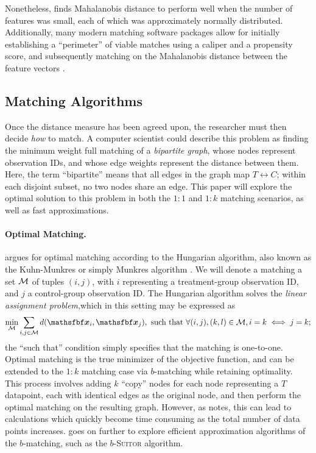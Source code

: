 \documentclass[11pt]{extarticle}
\begin{document}
Nonetheless, \textcite{leacy_joint_2014} finds Mahalanobis distance to perform well when the number of features was small, each of which was approximately normally distributed. Additionally, many modern matching software packages allow for initially establishing a ``perimeter'' of viable matches using a caliper and a propensity score, and subsequently matching on the Mahalanobis distance between the feature vectors \parencite{ho_matchit_2011}.


\subsection{Matching Algorithms}

Once the distance measure has been agreed upon, the researcher must then decide \emph{how} to match. A computer scientist could describe this problem as finding the minimum weight full matching of a \emph{bipartite graph}, whose nodes represent observation IDs, and whose edge weights represent the distance between them. Here, the term ``bipartite'' means that all edges in the graph map $T \leftrightarrow C$; within each disjoint subset, no two nodes share an edge. This paper will explore the optimal solution to this problem in both the $1:1$ and $1:k$ matching scenarios, as well as fast approximations.


\paragraph{Optimal Matching.} \textcite{rosenbaum_optimal_1989} argues for optimal matching according to the Hungarian algorithm, also known as the Kuhn-Munkres or simply Munkres algorithm \parencite{munkres_algorithms_1957}. We will denote a matching a set $\mathcal{M}$ of tuples $(i, j)$, with $i$ representing a treatment-group observation ID, and $j$ a control-group observation ID. The Hungarian algorithm solves the \emph{linear assignment problem},which in this setting may be expressed as
\begin{equation}
  \min_{\set{M}} \sum_{i, j \in \set{M}} d(\vec{x}_i, \vec{x}_j), \text{ such that } \forall (i, j), (k, l) \in \set{M}, i = k \iff j = k;
\end{equation}
the ``such that'' condition simply specifies that the matching is one-to-one. Optimal matching is the true minimizer of the objective function, and can be extended to the $1:k$ matching case via $b$-matching while retaining optimality.
This process involves adding $k$ ``copy'' nodes for each node representing a $T$ datapoint, each with identical edges as the original node, and then perform the optimal matching on the resulting graph.
However, as \textcite{khan_efficient_2016} notes, this can lead to calculations which quickly become time consuming as the total number of data points increases. \textcite{khan_efficient_2016} goes on further to explore efficient approximation algorithms of the $b$-matching, such as the $b$-\textsc{Suitor} algorithm.
\end{document}
